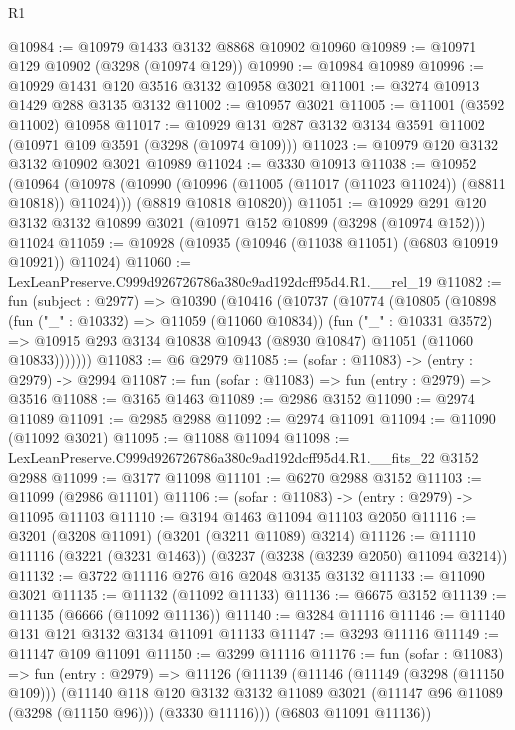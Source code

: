 \begin{lexlean}{R1}
\begin{coremodule}
@10984 := @10979 @1433 @3132 @8868 @10902 @10960
@10989 := @10971 @129 @10902 (@3298 (@10974 @129))
@10990 := @10984 @10989
@10996 := @10929 @1431 @120 @3516 @3132 @10958 @3021
@11001 := @3274 @10913 @1429 @288 @3135 @3132
@11002 := @10957 @3021
@11005 := @11001 (@3592 @11002) @10958
@11017 := @10929 @131 @287 @3132 @3134 @3591 @11002 (@10971 @109 @3591 (@3298 (@10974 @109)))
@11023 := @10979 @120 @3132 @3132 @10902 @3021 @10989
@11024 := @3330 @10913
@11038 := @10952
    (@10964
      (@10978 (@10990 (@10996 (@11005 (@11017 (@11023 @11024)) (@8811 @10818)) @11024)))
      (@8819 @10818 @10820))
@11051 := @10929
    @291
    @120
    @3132
    @3132
    @10899
    @3021
    (@10971 @152 @10899 (@3298 (@10974 @152)))
    @11024
@11059 := @10928 (@10935 (@10946 (@11038 @11051) (@6803 @10919 @10921)) @11024)
@11060 := LexLeanPreserve.C999d926726786a380c9ad192dcff95d4.R1.__rel_19
@11082 := fun (subject : @2977) =>
  @10390
    (@10416
      (@10737
        (@10774
          (@10805
            (@10898
              (fun ("_" : @10332) => @11059 (@11060 @10834))
              (fun ("_" : @10331 @3572) =>
              @10915 @293 @3134 @10838 @10943 (@8930 @10847) @11051 (@11060 @10833)))))))
@11083 := @6 @2979
@11085 := (sofar : @11083) -> (entry : @2979) -> @2994
@11087 := fun (sofar : @11083) => fun (entry : @2979) => @3516
@11088 := @3165 @1463
@11089 := @2986 @3152
@11090 := @2974 @11089
@11091 := @2985 @2988
@11092 := @2974 @11091
@11094 := @11090 (@11092 @3021)
@11095 := @11088 @11094
@11098 := LexLeanPreserve.C999d926726786a380c9ad192dcff95d4.R1.__fits_22 @3152 @2988
@11099 := @3177 @11098
@11101 := @6270 @2988 @3152
@11103 := @11099 (@2986 @11101)
@11106 := (sofar : @11083) -> (entry : @2979) -> @11095 @11103
@11110 := @3194 @1463 @11094 @11103 @2050
@11116 := @3201 (@3208 @11091) (@3201 (@3211 @11089) @3214)
@11126 := @11110 @11116 (@3221 (@3231 @1463)) (@3237 (@3238 (@3239 @2050) @11094 @3214))
@11132 := @3722 @11116 @276 @16 @2048 @3135 @3132
@11133 := @11090 @3021
@11135 := @11132 (@11092 @11133)
@11136 := @6675 @3152
@11139 := @11135 (@6666 (@11092 @11136))
@11140 := @3284 @11116
@11146 := @11140 @131 @121 @3132 @3134 @11091 @11133
@11147 := @3293 @11116
@11149 := @11147 @109 @11091
@11150 := @3299 @11116
@11176 := fun (sofar : @11083) =>
  fun (entry : @2979) =>
  @11126
    (@11139
      (@11146
        (@11149 (@3298 (@11150 @109)))
        (@11140
          @118
          @120
          @3132
          @3132
          @11089
          @3021
          (@11147 @96 @11089 (@3298 (@11150 @96)))
          (@3330 @11116)))
      (@6803 @11091 @11136))

\end{coremodule}
\end{lexlean}
